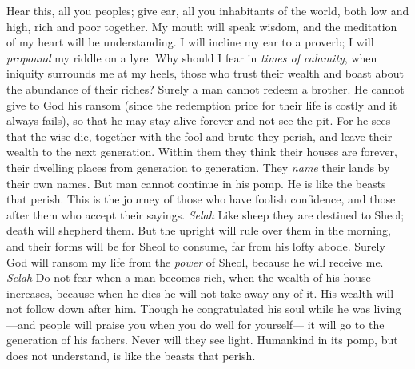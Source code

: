 \begin{biblechapter} %
 Hear this, all you peoples; 
give ear, all you inhabitants of the world,
\verse both low and high, 
rich and poor together.
\verse My mouth will speak wisdom, 
and the meditation of my heart will be understanding.
\verse I will incline my ear to a proverb; 
I will \textit{propound} my riddle on a lyre.
\verse Why should I fear in \textit{times of calamity}, 
when iniquity surrounds me at my heels,
\verse those who trust their wealth 
and boast about the abundance of their riches?
\verse Surely a man cannot redeem a brother. 
He cannot give to God his ransom
\verse (since the redemption price for their life is costly 
and it always fails),
\verse so that he may stay alive forever 
and not see the pit.
\verse For he sees that the wise die, 
together with the fool and brute they perish, 
and leave their wealth to the next generation.
\verse Within them they think their houses are forever, 
their dwelling places from generation to generation. 
They \textit{name} their lands by their own names.
\verse But man cannot continue in his pomp. 
He is like the beasts that perish.
\verse This is the journey of those who have foolish confidence, 
and those after them who accept their sayings. \textit{Selah}
\verse Like sheep they are destined to Sheol; 
death will shepherd them. 
But the upright will rule over them in the morning, 
and their forms will be for Sheol to consume, 
far from his lofty abode.
\verse Surely God will ransom my life 
from the \textit{power} of Sheol, 
because he will receive me. \textit{Selah}
\verse Do not fear when a man becomes rich, 
when the wealth of his house increases,
\verse because when he dies he will not take away any of it. 
His wealth will not follow down after him.
\verse Though he congratulated his soul while he was living 
—and people will praise you when you do well for yourself—
\verse it will go to the generation of his fathers. 
Never will they see light.
\verse Humankind in its pomp, but does not understand, 
is like the beasts that perish.
\end{biblechapter}

